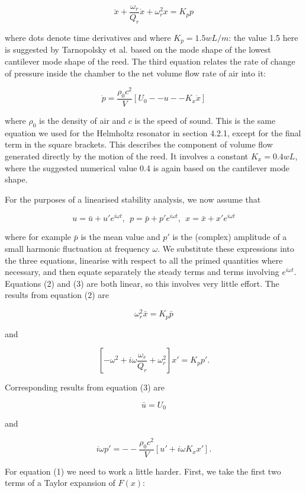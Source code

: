   $$\ddot{x}+\dfrac{\omega_r}{Q_r}\dot{x}+\omega_r^2 x = K_p p \tag{2}$$ 

  where dots denote time derivatives and where $K_p =1.5 w L/m$: the value 1.5 
  here is suggested by Tarnopolsky et al. based on the mode shape of the lowest 
  cantilever mode shape of the reed. The third equation relates the rate of 
  change of pressure inside the chamber to the net volume flow rate of air into 
  it: 

  $$\dot{p}=\dfrac{\rho_0 c^2}{V}[U_0 -- u -- K_x \dot{x}] \tag{3}$$ 

  where $\rho_0$ is the density of air and $c$ is the speed of sound. This is 
  the same equation we used for the Helmholtz resonator in section 4.2.1, 
  except for the final term in the square brackets. This describes the 
  component of volume flow generated directly by the motion of the reed. It 
  involves a constant $K_x=0.4wL$, where the suggested numerical value 0.4 is 
  again based on the cantilever mode shape. 

  For the purposes of a linearised stability analysis, we now assume that 

  $$u=\bar{u}+u' e^{i \omega t} \mathrm{,~~} p=\bar{p}+p' e^{i \omega t} 
  \mathrm{,~~} x=\bar{x}+x' e^{i \omega t} \tag{4}$$ 

  where for example $\bar{p}$ is the mean value and $p'$ is the (complex) 
  amplitude of a small harmonic fluctuation at frequency $\omega$. We 
  substitute these expressions into the three equations, linearise with respect 
  to all the primed quantities where necessary, and then equate separately the 
  steady terms and terms involving $e^{i \omega t}$. Equations (2) and (3) are 
  both linear, so this involves very little effort. The results from equation 
  (2) are 

  $$\omega_r^2 \bar{x}=K_p \bar{p} \tag{5}$$ 

  and 

  $$\left[ -\omega^2 + i \omega \dfrac{\omega_r}{Q_r} + \omega_r^2 \right]x' = 
  K_p p' . \tag{6}$$ 

  Corresponding results from equation (3) are 

  $$\bar{u}=U_0 \tag{7}$$ 

  and 

  $$i \omega p' = -- \dfrac{\rho_0 c^2}{V} [u'+i \omega K_x x'] . \tag{8}$$ 

  For equation (1) we need to work a little harder. First, we take the first 
  two terms of a Taylor expansion of $F(x)$: 


